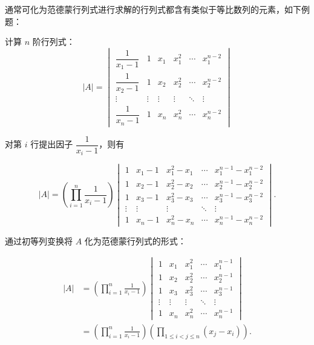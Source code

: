 通常可化为范德蒙行列式进行求解的行列式都含有类似于等比数列的元素，如下例题：

\begin{example}{}{}
    计算 $n$ 阶行列式：
    \[
        |A| = \begin{vmatrix}
            \dfrac{1}{x_1 - 1} & 1      & x_1    & x_1^2  & \cdots & x_1^{n-2} \\[1.2em]
            \dfrac{1}{x_2 - 1} & 1      & x_2    & x_2^2  & \cdots & x_2^{n-2} \\[1.2em]
            \vdots             & \vdots & \vdots & \vdots & \ddots & \vdots    \\[1.2em]
            \dfrac{1}{x_n - 1} & 1      & x_n    & x_n^2  & \cdots & x_n^{n-2}
        \end{vmatrix}
    \]
\end{example}

\begin{solution}
    对第 $i$ 行提出因子 $\dfrac{1}{x_i-1}$，则有

    \[
        |A| = \left(\displaystyle\prod_{i=1}^n \frac{1}{x_i-1} \right) \begin{vmatrix}
            1 & x_1 - 1 & x_1^2 - x_1 & \cdots & x_1^{n-1} - x_1^{n-2} \\
            1 & x_2 - 1 & x_2^2 - x_2 & \cdots & x_2^{n-1} - x_2^{n-2} \\
            1 & x_3 - 1 & x_3^2 - x_3 & \cdots & x_3^{n-1} - x_3^{n-2} \\
            \vdots & \vdots & \vdots & \ddots & \vdots \\
            1 & x_n - 1 & x_n^2 - x_n & \cdots & x_n^{n-1} - x_n^{n-2}
        \end{vmatrix}.
    \]

    通过初等列变换将 $A$ 化为范德蒙行列式的形式：

    \begin{align*}
        |A| &= \left(\displaystyle\prod_{i=1}^n \frac{1}{x_i-1} \right) \begin{vmatrix}
            1 & x_1 & x_1^2 & \cdots & x_1^{n-1} \\
            1 & x_2 & x_2^2 & \cdots & x_2^{n-1} \\
            1 & x_3 & x_3^2 & \cdots & x_3^{n-1} \\
            \vdots & \vdots & \vdots & \ddots & \vdots \\
            1 & x_n & x_n^2 & \cdots & x_n^{n-1}
        \end{vmatrix} \\
        &= \left(\displaystyle\prod_{i=1}^n \frac{1}{x_i-1} \right)
           \left(\displaystyle\prod_{1 \leqslant i < j \leqslant n} (x_j - x_i)\right).
    \end{align*}
\end{solution}

